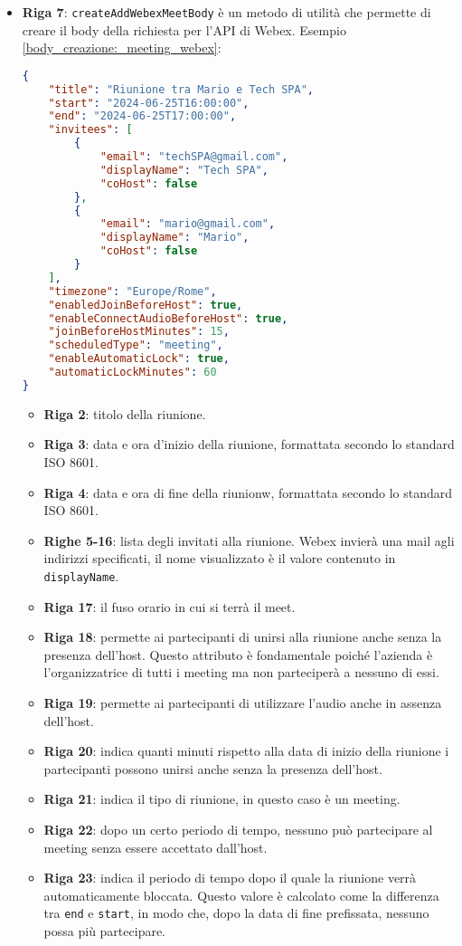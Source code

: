 \begin{itemize}
    \item \textbf{Riga 7}: \texttt{createAddWebexMeetBody} è un metodo di utilità che permette di creare il body
    della richiesta per l'API di Webex. Esempio \ref{body_creazione:_meeting_webex}:
    \begin{lstlisting}[language=json, caption={body creazione meeting - Webex}, label={body_creazione:_meeting_webex}]
{
    "title": "Riunione tra Mario e Tech SPA",
    "start": "2024-06-25T16:00:00",
    "end": "2024-06-25T17:00:00",
    "invitees": [
        {
            "email": "techSPA@gmail.com",
            "displayName": "Tech SPA",
            "coHost": false
        },
        {
            "email": "mario@gmail.com",
            "displayName": "Mario",
            "coHost": false
        }
    ],
    "timezone": "Europe/Rome",
    "enabledJoinBeforeHost": true,
    "enableConnectAudioBeforeHost": true,
    "joinBeforeHostMinutes": 15,
    "scheduledType": "meeting",
    "enableAutomaticLock": true,
    "automaticLockMinutes": 60
}
    \end{lstlisting}
    \begin{itemize}
        \item \textbf{Riga 2}: titolo della riunione.
        \item \textbf{Riga 3}: data e ora d'inizio della riunione, formattata secondo lo standard ISO 8601.
        \item \textbf{Riga 4}: data e ora di fine della riunionw, formattata secondo lo standard ISO 8601.
        \item \textbf{Righe 5-16}: lista degli invitati alla riunione. Webex invierà una mail agli indirizzi specificati, il nome
        visualizzato è il valore contenuto in \texttt{displayName}.
        \item \textbf{Riga 17}: il fuso orario in cui si terrà il meet.
        \item \textbf{Riga 18}: permette ai partecipanti di unirsi alla riunione anche senza la presenza dell'host. 
        Questo attributo è fondamentale poiché l'azienda è l'organizzatrice di tutti i meeting ma non parteciperà a nessuno di essi.
        \item \textbf{Riga 19}: permette ai partecipanti di utilizzare l'audio anche in assenza dell'host.
        \item \textbf{Riga 20}: indica quanti minuti rispetto alla data di inizio della riunione i partecipanti possono unirsi anche senza la presenza dell'host.
        \item \textbf{Riga 21}: indica il tipo di riunione, in questo caso è un meeting.
        \item \textbf{Riga 22}: dopo un certo periodo di tempo, nessuno può partecipare al meeting senza essere accettato dall'host.
        \item \textbf{Riga 23}: indica il periodo di tempo dopo il quale la riunione verrà automaticamente bloccata. 
        Questo valore è calcolato come la differenza tra \texttt{end} e \texttt{start}, in modo che, dopo la data di fine prefissata, 
        nessuno possa più partecipare.
    \end{itemize}


\end{itemize}

